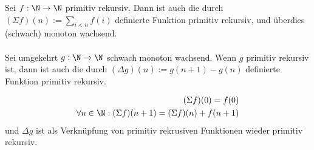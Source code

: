 
\begin{exercise}[196]

Sei $f: \N \to \N$ primitiv rekursiv. Dann ist auch die durch
$(\Sigma f)(n) := \sum_{i < n} f(i)$ definierte Funktion primitiv rekursiv,
und überdies (schwach) monoton wachsend. 
\\
\\
Sei umgekehrt $g:\N \to \N$ schwach monoton wachsend. Wenn $g$ primitiv rekursiv ist, dann ist auch die durch $(\Delta g)(n) := g(n + 1) - g(n)$ definierte Funktion primitiv rekursiv.

\end{exercise}


\begin{solution}

	\begin{align*}
	(\Sigma f)(0) = f(0) \\
	\forall n \in \N: (\Sigma f)(n + 1) = (\Sigma f)(n) + f(n + 1)
	\end{align*}
	und $\Delta g$ ist als Verknüpfung von primitiv rekrusiven Funktionen wieder primitiv rekursiv.

\end{solution}
